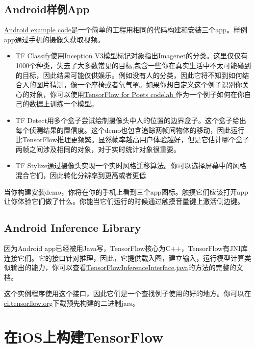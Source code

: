 \subsection{Android样例App}
\href{https://www.github.com/tensorflow/tensorflow/blob/r1.4/tensorflow/examples/android/}{Android example code}是一个简单的工程用相同的代码构建和安装三个app。样例app通过手机的摄像头获取视频。
\begin{itemize}
\item TF Classify使用Inception V3模型标记对象指出Imagenet的分类。这里仅仅有1000个种类，失去了大多数常见的目标,包含一些你在真实生活中不太可能碰到的目标，因此结果可能仅供娱乐。例如没有人的分类，因此它将不知到如何结合人的图片猜测，像一个座椅或者氧气罩。如果你想自定义这个例子识别你关心的对象，你可以使用\href{https://codelabs.developers.google.com/codelabs/tensorflow-for-poets/index.html?hl=zh-cn#0}{TensorFlow for Poets codelab }作为一个例子如何在你自己的数据上训练一个模型。
\item TF Detect用多个盒子尝试绘制摄像头中人的位置的边界盒子。这个盒子给出每个侦测结果的置信度。这个demo也包含追踪两帧间物体的移动，因此运行比TensorFlow推理更频繁。显然帧率越高用户体验越好，但是它估计哪个盒子两帧之间涉及相同的对象，对于实时统计对象很重要。
\item TF Stylize通过摄像头实现一个实时风格迁移算法。你可以选择屏幕中的风格混合它们，因此转化分辨率到更高或者更低
\end{itemize}
当你构建安装demo，你将在你的手机上看到三个app图标。触摸它们应该打开app让你体验它们做了什么。你能当它们运行的时候通过触摸音量键上激活侧边键。
\subsection{Android Inference Library}
因为Android app已经被用Java写，TensorFlow核心为C++，TensorFlow有JNI库连接它们。它的接口针对推理，因此，它提供载入图，建立输入，运行模型计算类似输出的能力，你可以查看\href{https://www.github.com/tensorflow/tensorflow/blob/r1.4/tensorflow/contrib/android/java/org/tensorflow/contrib/android/TensorFlowInferenceInterface.java}{TensorFlowInferenceInterface.java}的方法的完整的文档。

这个实例程序使用这个接口，因此它们是一个查找例子使用的好的地方。你可以在\href{https://ci.tensorflow.org/view/Nightly/job/nightly-android/?hl=zh-cn}{ci.tensorflow.org}下载预先构建的二进制jars。
\section{在iOS上构建TensorFlow}
